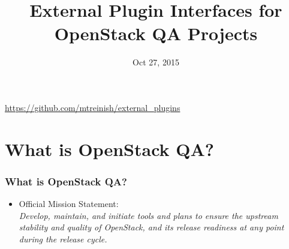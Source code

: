 \documentclass[aspectratio=169,11pt,hyperref={colorlinks=true}]{beamer}
\author[Matthew Treinish \& Andrea Frittoli]{%
    \texorpdfstring{
        \begin{columns}
            \column{.45\linewidth}
            \centering
            Matthew Treinish\\
            \href{mailto:mtreinish@kortar.org}{mtreinish@kortar.org}\\
            \texttt{mtreinish on Freenode}
            \column{.45\linewidth}
            \centering
            Andrea Frittoli\\
            \href{mailto:andrea.frittoli@hp.com}{andrea.frittoli@hp.com}\\
            \texttt{andreaf on Freenode}
        \end{columns}
   }
   {Matthew Treinish \& Andrea Frittoli}
}
\date{Oct 27, 2015}
\title[External Plugin Interfaces for OpenStack QA Projects
\hspace{2em}\insertframenumber/\inserttotalframenumber]{External Plugin Interfaces for OpenStack QA Projects}
\begin{document}
{
\begin{frame}[noframenumbering]
    \hypersetup{colorlinks,urlcolor=white}
    \titlepage{}
    \centering
    \href{https://github.com/mtreinish/external\_plugins}{https://github.com/mtreinish/external\_plugins}
\end{frame}
}

\section{What is OpenStack QA?}
\begin{frame}
    \frametitle{What is OpenStack QA?}
    \begin{itemize}
     \item Official Mission Statement:\\
         \textit{Develop, maintain, and initiate tools and plans to ensure
the upstream stability and quality of OpenStack, and its release readiness at
any point during the release cycle.}
    \end{itemize}
\end{frame}
\end{document}
